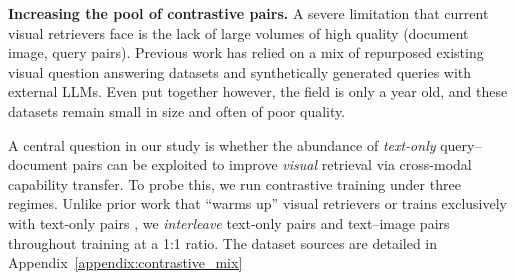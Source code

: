 \noindent\textbf{Increasing the pool of contrastive pairs.}
\label{sec:scaling=-cont}
A severe limitation that current visual retrievers face is the lack of large volumes of high quality (document image, query pairs). 
Previous work  has relied on a mix of repurposed existing visual question answering datasets and synthetically generated queries with external LLMs. Even put together however, the field is only a year old, and these datasets remain small in size and often of poor quality.


A central question in our study is whether the abundance of \emph{text-only} query–document pairs can be exploited to improve \emph{visual} retrieval via cross-modal capability transfer. To probe this, we run contrastive training under three regimes. Unlike prior work that “warms up” visual retrievers or trains exclusively with text-only pairs , we \emph{interleave} text-only pairs and text–image pairs throughout training at a 1:1 ratio. The dataset sources are detailed in Appendix~\ref{appendix:contrastive_mix}

